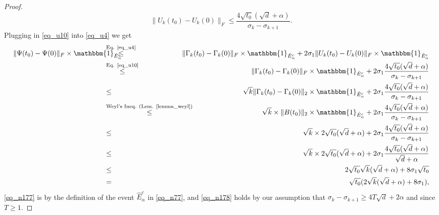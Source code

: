 \documentclass[11pt,letterpaper]{article}
\begin{document}
\begin{proof}
\begin{equation}\label{eq_u10}
    \|U_k(t_0) -U_k(0)\|_F \leq \frac{4\sqrt{t_0}(\sqrt{d} + \alpha)}{\sigma_k - \sigma_{k+1}}.
\end{equation}
%
Plugging in \eqref{eq_u10} into \eqref{eq_u4} we get
%
\begin{eqnarray}
    \|\Psi(t_0) - \Psi(0)\|_F \times \mathbbm{1}_{\hat{E}_\alpha^c} \!\!\!\!\!\!\!\!\!\!\!\!\!\!\! &\stackrel{\textrm{Eq. \eqref{eq_u4}}}{\leq}  & \!\!\!\!\!\!\!\!\!\!\!\!\!\!\! \|\Gamma_k(t_0) -\Gamma_k(0)\|_F \times\mathbbm{1}_{\hat{E}_\alpha^c}  + 2\sigma_1 \|U_k(t_0) -U_k(0)\|_F\times \mathbbm{1}_{\hat{E}_\alpha^c} \nonumber\\
    &\stackrel{\textrm{Eq. \eqref{eq_u10}}}{\leq} &\|\Gamma_k(t_0) -\Gamma_k(0)\|_F \times\mathbbm{1}_{\hat{E}_\alpha^c}  + 2\sigma_1 \frac{4\sqrt{t_0}(\sqrt{d} + \alpha)}{\sigma_k - \sigma_{k+1}} \nonumber\\
    &\leq  & \sqrt{k}\|\Gamma_k(t_0) -\Gamma_k(0)\|_2 \times\mathbbm{1}_{\hat{E}_\alpha^c}  + 2\sigma_1 \frac{4\sqrt{t_0}(\sqrt{d} + \alpha)}{\sigma_k - \sigma_{k+1}} \nonumber\\
    &\stackrel{\textrm{Weyl's Ineq. } (\textrm{Lem. \ref{lemma_weyl})}}{\leq} &  \sqrt{k} \times \|B(t_0)\|_2 \times\mathbbm{1}_{\hat{E}_\alpha^c}  + 2\sigma_1 \frac{4\sqrt{t_0}(\sqrt{d} + \alpha)}{\sigma_k - \sigma_{k+1}} \nonumber\\
                &\leq & \sqrt{k} \times  2\sqrt{t_0}(\sqrt{d} + \alpha)  + 2\sigma_1 \frac{4\sqrt{t_0}(\sqrt{d} + \alpha)}{\sigma_k - \sigma_{k+1}} \label{eq_n177}\\
                &\leq & \sqrt{k} \times  2\sqrt{t_0}(\sqrt{d} + \alpha)  + 2\sigma_1 \frac{4\sqrt{t_0}(\sqrt{d} + \alpha)}{\sqrt{d} + \alpha} \label{eq_n178}\\
                 &\leq  & 2\sqrt{t_0} \sqrt{k} (\sqrt{d} + \alpha)  + 8\sigma_1 \sqrt{t_0} \nonumber\\
                 &= &  \sqrt{t_0}(2 \sqrt{k} (\sqrt{d} + \alpha)  + 8\sigma_1), \label{eq_u11}
        \end{eqnarray}
          \eqref{eq_n177} is by the definition of the event $\hat{E}^c_\alpha$ in \eqref{eq_n77}, and \eqref{eq_n178} holds by our assumption that $\sigma_k - \sigma_{k+1} \geq  4T \sqrt{d} + 2\alpha$ and since $T\geq 1$.
\end{proof}
\end{document}
